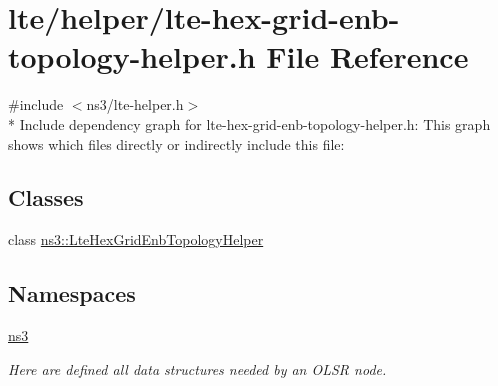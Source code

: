 \hypertarget{lte-hex-grid-enb-topology-helper_8h}{}\section{lte/helper/lte-\/hex-\/grid-\/enb-\/topology-\/helper.h File Reference}
\label{lte-hex-grid-enb-topology-helper_8h}
{\ttfamily \#include $<$ns3/lte-\/helper.\+h$>$}\\*
Include dependency graph for lte-\/hex-\/grid-\/enb-\/topology-\/helper.h\+:
This graph shows which files directly or indirectly include this file\+:
\subsection*{Classes}
\begin{DoxyCompactItemize}
\item 
class \hyperlink{classns3_1_1LteHexGridEnbTopologyHelper}{ns3\+::\+Lte\+Hex\+Grid\+Enb\+Topology\+Helper}
\end{DoxyCompactItemize}
\subsection*{Namespaces}
\begin{DoxyCompactItemize}
\item 
 \hyperlink{namespacens3}{ns3}
\begin{DoxyCompactList}\small\item\em Here are defined all data structures needed by an O\+L\+SR node. \end{DoxyCompactList}\end{DoxyCompactItemize}
